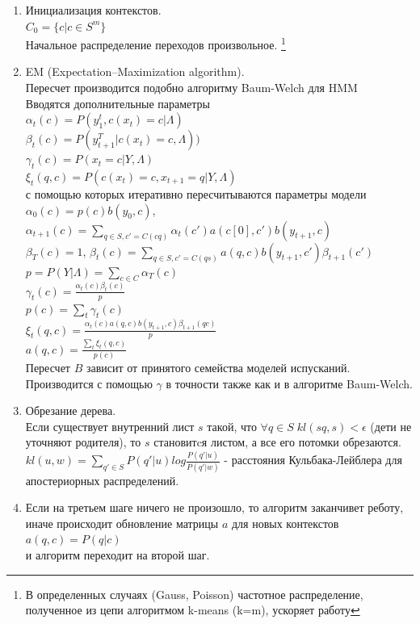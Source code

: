 \documentclass[10pt,a4paper]{article}
\begin{document}
\begin{enumerate}
\item Инициализация контекстов.
\\
$ C_{0} = \{c| c\in S^{m}\}$
\\
Начальное распределение переходов произвольное.
\footnote{В определенных случаях (Gauss, Poisson) частотное распределение, полученное из цепи алгоритмом k-means (k=m), ускоряет работу}
\\
\item EM (Expectation–Maximization algorithm).
\\
Пересчет производится подобно алгоритму Baum-Welch для HMM
\\
Вводятся дополнительные параметры
\\
$ \alpha_{t}(c) = P(y_{1}^{t}, c(x_{t})=c| \Lambda)$
\\
$ \beta_{t}(c) = P(y_{t+1}^{T}| c(x_{t})=c, \Lambda))$
\\
$ \gamma_{t}(c) = P(x_{t}=c|Y,\Lambda) $
\\
$ \xi_{t}(q,c) = P(c(x_{t})=c, x_{t+1} = q| Y, \Lambda)$
\\
с помощью которых итеративно пересчитываются параметры модели
\\
$ \alpha_{0}(c) = p(c)b(y_{0},c)$, 
$ \alpha_{t+1}(c) = \sum_{q \in S, c'=C(cq)}{\alpha_{t}(c')a(c[0],c')b(y_{t+1},c)}$
\\
$ \beta_{T}(c) = 1$, 
$ \beta_{t}(c) = \sum_{q \in S, c'=C(qs)}{a(q,c)b(y_{t+1}, c')\beta_{t+1}(c')}$
\\
$p = P(Y|\Lambda) = \sum_{c \in C}\alpha_{T}(c)$
\\ 
$ \gamma_{t}(c) = \frac{\alpha_{t}(c)\beta_{t}(c)}{p}$
\\
$p(c) = \sum_{t}\gamma_{t}(c)$
\\
$ \xi_{t}(q,c) = \frac{\alpha_{t}(c)a(q,c)b(y_{t+1},c)\beta_{t+1}(qc)}{p} $
\\
$ a(q, c) = \frac{\sum_{t}\xi_{t}(q,c)}{p(c)}$
\\
Пересчет $ B $ зависит от принятого семейства моделей испусканий. Производится с помощью $ \gamma $ в точности также как и в алгоритме Baum-Welch.
\\
\item Обрезание дерева.
\\
Если существует внутренний лист $ s $ такой, что $ \forall q \in S \; kl(sq, s) < \epsilon $ (дети не уточняют родителя), то $ s $ становитcя листом, а все его потомки обрезаются.
\\
$kl(u, w) = \sum_{q' \in S} P(q'|u) log\frac{P(q'|u)}{P(q'|w)}$ - расстояния Кульбака-Лейблера для апостериорных распределений.
\\
\item Если на третьем шаге ничего не произошло, то алгоритм заканчивет реботу, 
иначе происходит обновление матрицы $ a $ для новых контекстов
\\
$ a(q, c) = P(q| c)$
\\
и алгоритм переходит на второй шаг.
\\
\end{enumerate}
\end{document}
